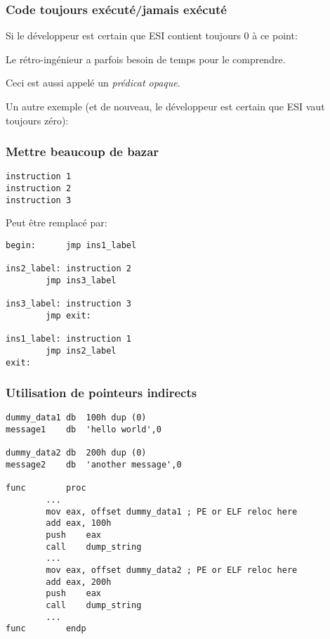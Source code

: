 \subsubsection{Code toujours exécuté/jamais exécuté}

Si le développeur est certain que ESI contient toujours 0 à ce point:



Le rétro-ingénieur a parfois besoin de temps pour le comprendre.

Ceci est aussi appelé un \emph{prédicat opaque}.

Un autre exemple (et de nouveau, le développeur est certain que ESI vaut toujours
zéro):



\subsubsection{Mettre beaucoup de bazar}

\begin{lstlisting}
instruction 1
instruction 2
instruction 3
\end{lstlisting}

Peut être remplacé par:

\begin{lstlisting}[style=customasmx86]
begin:		jmp	ins1_label

ins2_label:	instruction 2
		jmp	ins3_label

ins3_label:	instruction 3
		jmp	exit:

ins1_label:	instruction 1
		jmp	ins2_label
exit:
\end{lstlisting}

\subsubsection{Utilisation de pointeurs indirects}

\begin{lstlisting}[style=customasmx86]
dummy_data1	db	100h dup (0)
message1	db	'hello world',0

dummy_data2	db	200h dup (0)
message2	db	'another message',0

func		proc
		...
		mov	eax, offset dummy_data1 ; PE or ELF reloc here
		add	eax, 100h
		push	eax
		call	dump_string
		...
		mov	eax, offset dummy_data2 ; PE or ELF reloc here
		add	eax, 200h
		push	eax
		call	dump_string
		...
func		endp
\end{lstlisting}


